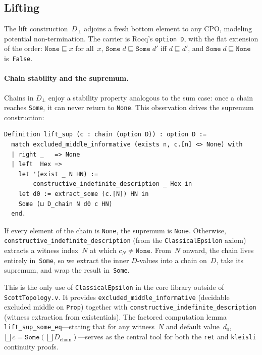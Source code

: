 \subsection{Lifting}
\label{sec:meth-lift}


The lift construction~$D_\bot$ adjoins a fresh bottom element to any
CPO, modeling potential non-termination.  The carrier is Rocq's
\texttt{option~D}, with the flat extension of the order:
$\texttt{None} \sqsubseteq x$ for all~$x$,
\;$\texttt{Some}\;d \sqsubseteq \texttt{Some}\;d'$ iff
$d \sqsubseteq d'$,
\;and $\texttt{Some}\;d \sqsubseteq \texttt{None}$ is~\texttt{False}.

\paragraph{Chain stability and the supremum.}
Chains in $D_\bot$ enjoy a stability property analogous to the sum case:
once a chain reaches \texttt{Some}, it can never return to
\texttt{None}.  This observation drives the supremum construction:

\begin{lstlisting}[caption={The lift supremum.},
                    label={lst:liftsup}]
Definition lift_sup (c : chain (option D)) : option D :=
  match excluded_middle_informative (exists n, c.[n] <> None) with
  | right _   => None
  | left  Hex =>
    let '(exist _ N HN) :=
        constructive_indefinite_description _ Hex in
    let d0 := extract_some (c.[N]) HN in
    Some (⊔ D_chain N d0 c HN)
  end.
\end{lstlisting}

\noindent
If every element of the chain is \texttt{None}, the supremum is
\texttt{None}.  Otherwise, \texttt{constructive\_indefinite\_description}
(from the \texttt{ClassicalEpsilon} axiom) extracts a witness
index~$N$ at which $c_N \neq \texttt{None}$.  From~$N$ onward, the
chain lives entirely in~\texttt{Some}, so we extract the inner
$D$-values into a chain on~$D$, take its supremum, and wrap the result
in~\texttt{Some}.

This is the only use of \texttt{ClassicalEpsilon} in the core library
outside of \texttt{ScottTopology.v}.  It provides
\texttt{excluded\_middle\_informative} (decidable excluded middle on
\texttt{Prop}) together with \texttt{constructive\_indefinite\_description}
(witness extraction from existentials).  The factored computation lemma
\texttt{lift\_sup\_some\_eq}---stating that for any witness~$N$ and
default value~$d_0$, $\bigsqcup c = \texttt{Some}(\bigsqcup
D_{\mathrm{chain}})$---serves as the central tool for both the
\texttt{ret} and \texttt{kleisli} continuity proofs.

